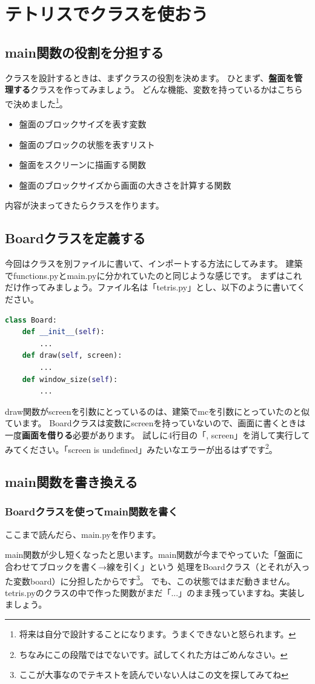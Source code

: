 \documentclass[12pt, a4paper, dvipdfmx]{book}
\begin{document}
\chapter{テトリスでクラスを使おう}
\section{main関数の役割を分担する}
クラスを設計するときは、まずクラスの役割を決めます。
ひとまず、\textbf{盤面を管理する}クラスを作ってみましょう。
どんな機能、変数を持っているかはこちらで決めました\footnote{将来は自分で設計することになります。うまくできないと怒られます。}。
\begin{itemize}
  \item 盤面のブロックサイズを表す変数
  \item 盤面のブロックの状態を表すリスト
  \item 盤面をスクリーンに描画する関数
  \item 盤面のブロックサイズから画面の大きさを計算する関数
\end{itemize}
内容が決まってきたらクラスを作ります。
\section{Boardクラスを定義する}
今回はクラスを別ファイルに書いて、インポートする方法にしてみます。
建築でfunctions.pyとmain.pyに分かれていたのと同じような感じです。
まずはこれだけ作ってみましょう。ファイル名は「tetris.py」とし、以下のように書いてください。
\begin{lstlisting}[caption={tetris.py},label=sample, language=Python]
class Board:
    def __init__(self):
        ...
    def draw(self, screen):
        ...
    def window_size(self):
        ...
\end{lstlisting}
draw関数がscreenを引数にとっているのは、建築でmcを引数にとっていたのと似ています。
Boardクラスは変数にscreenを持っていないので、画面に書くときは一度\textbf{画面を借りる}必要があります。
試しに4行目の「, screen」を消して実行してみてください。「screen is undefined」みたいなエラーが出るはずです\footnote{ちなみにこの段階ではでないです。試してくれた方はごめんなさい。}。
\section{main関数を書き換える}
\subsection{Boardクラスを使ってmain関数を書く}
ここまで読んだら、main.pyを作ります。

main関数が少し短くなったと思います。main関数が今までやっていた「盤面に合わせてブロックを書く→線を引く」という
処理をBoardクラス（とそれが入った変数board）に分担したからです\footnote{ここが大事なのでテキストを読んでいない人はこの文を探してみてね}。
でも、この状態ではまだ動きません。tetris.pyのクラスの中で作った関数がまだ「...」のまま残っていますね。実装しましょう。
\end{document}
